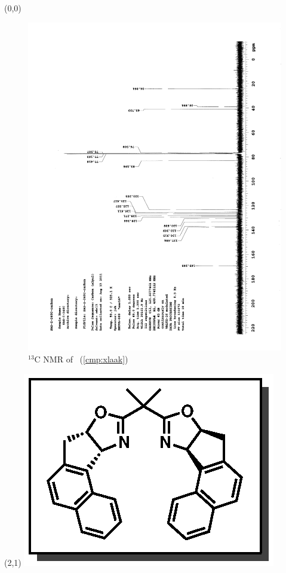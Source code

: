 \clearpage
\begin{textblock}{20}(0,0)
\begin{figure}[htb]
\caption{$^{13}$C NMR of  \CMPxlaak\ (\ref{cmp:xlaak})}
\includegraphics[scale=0.75, trim = 0mm 0mm 0mm 5mm,
clip]{chp_asymmetric/images/nmr/xlaakC}
\vspace{-100pt}
\end{figure}
\end{textblock}
\begin{textblock}{1}(2,1)
\includegraphics[scale=0.8, angle=90]{chp_asymmetric/images/xlaak}
\end{textblock}
\clearpage

